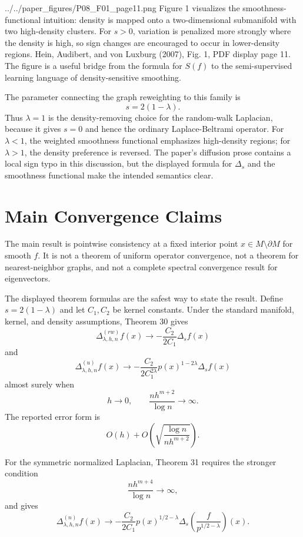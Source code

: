 \documentclass[11pt]{article}
\begin{document}
\paperfigure
  {../../paper_figures/P08_F01_page11.png}
  {Figure 1 visualizes the smoothness-functional intuition: density is mapped
  onto a two-dimensional submanifold with two high-density clusters.  For
  $s>0$, variation is penalized more strongly where the density is high, so
  sign changes are encouraged to occur in lower-density regions.}
  {Hein, Audibert, and von Luxburg (2007), Fig. 1, PDF display page 11.}
  {The figure is a useful bridge from the formula for $S(f)$ to the
  semi-supervised learning language of density-sensitive smoothing.}

The parameter connecting the graph reweighting to this family is
\[
  s = 2(1-\lambda).
\]
Thus $\lambda=1$ is the density-removing choice for the random-walk
Laplacian, because it gives $s=0$ and hence the ordinary Laplace-Beltrami
operator.  For $\lambda<1$, the weighted smoothness functional emphasizes
high-density regions; for $\lambda>1$, the density preference is reversed.
The paper's diffusion prose contains a local sign typo in this discussion,
but the displayed formula for $\Delta_s$ and the smoothness functional make
the intended semantics clear.

\section{Main Convergence Claims}

The main result is pointwise consistency at a fixed interior point
$x \in M\setminus\partial M$ for smooth $f$.  It is not a theorem of uniform
operator convergence, not a theorem for nearest-neighbor graphs, and not a
complete spectral convergence result for eigenvectors.

The displayed theorem formulas are the safest way to state the result.  Define
$s=2(1-\lambda)$ and let $C_1,C_2$ be kernel constants.  Under the standard
manifold, kernel, and density assumptions, Theorem 30 gives
\[
  \Delta^{(rw)}_{\lambda,h,n}f(x)
  \longrightarrow
  -\frac{C_2}{2C_1}\Delta_s f(x)
\]
and
\[
  \Delta^{(u)}_{\lambda,h,n}f(x)
  \longrightarrow
  -\frac{C_2}{2C_1^{2\lambda}}
  p(x)^{1-2\lambda}\Delta_s f(x)
\]
almost surely when
\[
  h\to 0,
  \qquad
  \frac{n h^{m+2}}{\log n}\to\infty.
\]
The reported error form is
\[
  O(h) + O\!\left(\sqrt{\frac{\log n}{n h^{m+2}}}\right).
\]

For the symmetric normalized Laplacian, Theorem 31 requires the stronger
condition
\[
  \frac{n h^{m+4}}{\log n}\to\infty,
\]
and gives
\[
  \Delta^{(n)}_{\lambda,h,n}f(x)
  \longrightarrow
  -\frac{C_2}{2C_1}
  p(x)^{1/2-\lambda}
  \Delta_s\!\left(
    \frac{f}{p^{1/2-\lambda}}
  \right)(x).
\]
\end{document}
